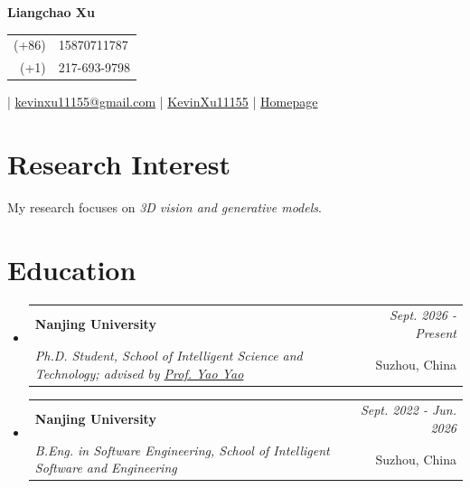 \documentclass[a4paper,11pt]{article}
\makeatletter
\newcommand{\resumeSubheading}[4]{
\vspace{0.5mm}\item
    \begin{tabular*}{0.98\textwidth}[t]{l@{\extracolsep{\fill}}r}
        \textbf{#1} & \textit{\footnotesize{#4}} \\
        \textit{\footnotesize{#3}} &  \footnotesize{#2}\\
    \end{tabular*}
    \vspace{-1.2mm}
}
\newcommand{\resumeSubHeadingListStart}{\begin{itemize}[leftmargin=*,labelsep=1mm]}
\newcommand{\resumeSubHeadingListEnd}{\end{itemize}\vspace{3mm}}
\newcommand{\socialicon}[1]{\raisebox{-0.05em}{\resizebox{!}{1em}{#1}}}
\newcommand{\headerfontiii}{\fontfamily{ppl}\selectfont} %
\makeatother
\begin{document}
\headerfontiii

\begin{center}
    {\Huge\textbf{Liangchao Xu}}
\end{center}

\begin{center}
    \small
    \raisebox{-0.42\height}{\socialicon{\faPhone}}\hspace{0.45em}%
    \begin{tabular}[c]{@{}r@{\ }l@{}}
        (+86) & 15870711787\\[-0.12em]
        (+1) & 217-693-9798
    \end{tabular}
    \quad | \quad
    \raisebox{-0.05\height}{\socialicon{\faEnvelope}}\hspace{0.45em}\href{mailto:kevinxu11155@gmail.com}{kevinxu11155@gmail.com}
    \quad | \quad
    \socialicon{\faGithub} \href{https://github.com/KevinXu11155}{KevinXu11155}
    \quad | \quad
    \socialicon{\faHome} \href{https://kevinxu11155.github.io}{Homepage}
\end{center}
\vspace{-4.5mm}

\section{\textbf{Research Interest}}
\vspace{1mm}
\small{
My research focuses on \textit{3D vision and generative models}.
}
\vspace{0mm}

\section{\textbf{Education}}
\vspace{-0.4mm}
\resumeSubHeadingListStart

\resumeSubheading
{Nanjing University}{Suzhou, China}
{\textnormal{Ph.D. Student, School of Intelligent Science and Technology; advised by \href{https://yoyo000.github.io}{Prof. Yao Yao}}}{Sept. 2026 - Present}

\resumeSubheading
{Nanjing University}{Suzhou, China}
{\textnormal{B.Eng. in Software Engineering, School of Intelligent Software and Engineering}}{Sept. 2022 - Jun. 2026}

\resumeSubHeadingListEnd
\vspace{-2mm}
\end{document}
